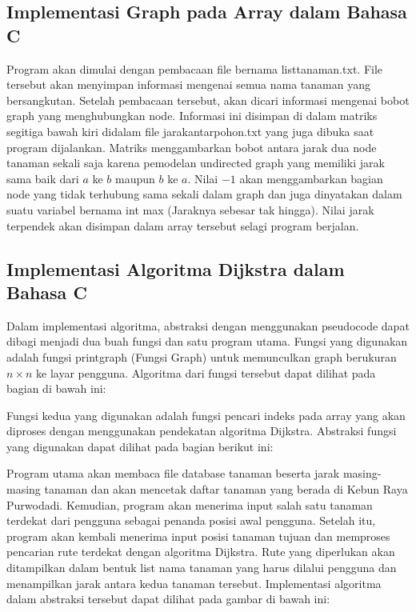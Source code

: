 \documentclass[conference]{IEEEtran}
\begin{document}
\subsection{Implementasi Graph pada Array dalam Bahasa C}
Program akan dimulai dengan pembacaan file bernama
listtanaman.txt. File tersebut akan menyimpan informasi mengenai
semua nama tanaman yang bersangkutan. Setelah pembacaan
tersebut, akan dicari informasi mengenai bobot graph
yang menghubungkan node. Informasi ini disimpan di dalam
matriks segitiga bawah kiri didalam file jarakantarpohon.txt
yang juga dibuka saat program dijalankan. Matriks menggambarkan
bobot antara jarak dua node tanaman sekali saja karena
pemodelan undirected graph yang memiliki jarak sama baik
dari $a$ ke $b$ maupun $b$ ke $a$. Nilai $-1$ akan menggambarkan
bagian node yang tidak terhubung sama sekali dalam graph
dan juga dinyatakan dalam suatu variabel bernama int max
(Jaraknya sebesar tak hingga). Nilai jarak terpendek akan
disimpan dalam array tersebut selagi program berjalan.

\subsection{Implementasi Algoritma Dijkstra dalam Bahasa C}
Dalam implementasi algoritma, abstraksi dengan menggunakan
pseudocode dapat dibagi menjadi dua buah fungsi dan
satu program utama. Fungsi yang digunakan adalah fungsi
printgraph (Fungsi Graph) untuk memunculkan graph berukuran
$n\times n$ ke layar pengguna. Algoritma dari fungsi tersebut
dapat dilihat pada bagian di bawah ini:

\begin{figure}[htbp]
    \centering
    \scalebox{0.88}{}
\end{figure}
Fungsi kedua yang digunakan adalah fungsi pencari indeks
pada array yang akan diproses dengan menggunakan pendekatan
algoritma Dijkstra. Abstraksi fungsi yang digunakan
dapat dilihat pada bagian berikut ini:

\begin{figure}[htbp]
    \centering
    \scalebox{0.84}{}
\end{figure}
Program utama akan membaca file database tanaman
beserta jarak masing-masing tanaman dan akan mencetak
daftar tanaman yang berada di Kebun Raya Purwodadi.
Kemudian, program akan menerima input salah satu tanaman
terdekat dari pengguna sebagai penanda posisi awal pengguna.
Setelah itu, program akan kembali menerima input posisi
tanaman tujuan dan memproses pencarian rute terdekat dengan
algoritma Dijkstra. Rute yang diperlukan akan ditampilkan
dalam bentuk list nama tanaman yang harus dilalui pengguna
dan menampilkan jarak antara kedua tanaman tersebut.
Implementasi algoritma dalam abstraksi tersebut dapat dilihat
pada gambar di bawah ini:
\end{document}
